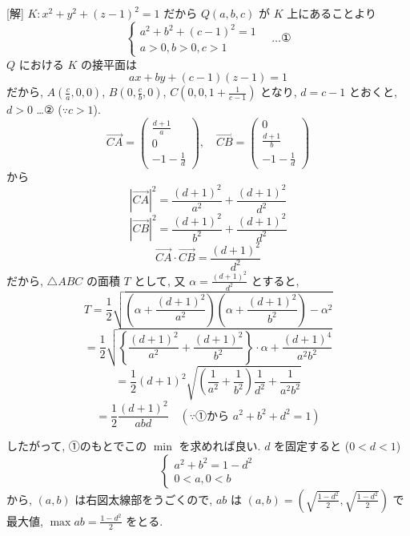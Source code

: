\documentclass[../main.tex]{subfiles}
\begin{document}
[解] $K: x^2 + y^2 + (z-1)^2 = 1$ だから $Q(a, b, c)$ が $K$ 上にあることより
\[
  \begin{cases}
    a^2 + b^2 + (c-1)^2 = 1 \\
    a > 0, b > 0, c > 1
  \end{cases}
  \quad \dots \text{①}
\]
$Q$ における $K$ の接平面は
\[
  a x + b y + (c-1)(z-1) = 1
\]
だから, $A\left(\frac{c}{a}, 0, 0\right)$, $B\left(0, \frac{c}{b}, 0\right)$, $C\left(0, 0, 1 + \frac{1}{c-1}\right)$ となり, $d = c-1$ とおくと, $d > 0$ \dots ② ($\because c > 1$).
\[
  \vec{CA} =
  \begin{pmatrix} \frac{d+1}{a} \\ 0 \\ -1 - \frac{1}{d}
  \end{pmatrix}, \quad
  \vec{CB} =
  \begin{pmatrix} 0 \\ \frac{d+1}{b} \\ -1 - \frac{1}{d}
  \end{pmatrix}
\]
から
\[
  |\vec{CA}|^2 = \frac{(d+1)^2}{a^2} + \frac{(d+1)^2}{d^2}
\]
\[
  |\vec{CB}|^2 = \frac{(d+1)^2}{b^2} + \frac{(d+1)^2}{d^2}
\]
\[
  \vec{CA} \cdot \vec{CB} = \frac{(d+1)^2}{d^2}
\]
だから, $\triangle ABC$ の面積 $T$ として, 又 $\alpha = \frac{(d+1)^2}{d^2}$ とすると,
\[
  T = \frac{1}{2} \sqrt{ \left(\alpha + \frac{(d+1)^2}{a^2}\right)\left(\alpha + \frac{(d+1)^2}{b^2}\right) - \alpha^2 }
\]
\[
  = \frac{1}{2} \sqrt{ \left\{ \frac{(d+1)^2}{a^2} + \frac{(d+1)^2}{b^2} \right\} \cdot \alpha + \frac{(d+1)^4}{a^2 b^2} }
\]
\[
  = \frac{1}{2} (d+1)^2 \sqrt{ \left(\frac{1}{a^2} + \frac{1}{b^2}\right) \frac{1}{d^2} + \frac{1}{a^2 b^2} }
\]
\[
  = \frac{1}{2} \frac{(d+1)^2}{a b d} \quad (\because \text{①から } a^2 + b^2 + d^2 = 1)
\]

したがって, ①のもとでこの $\min$ を求めれば良い. $d$ を固定すると ($0 < d < 1$)
\[
  \begin{cases}
    a^2 + b^2 = 1 - d^2 \\
    0 < a, 0 < b
  \end{cases}
\]
から, $(a, b)$ は右図太線部をうごくので, $ab$ は $(a, b) = \left( \sqrt{\frac{1-d^2}{2}}, \sqrt{\frac{1-d^2}{2}} \right)$ で最大値, $\max ab = \frac{1-d^2}{2}$ をとる.

\begin{center}
\end{center}
\end{document}
